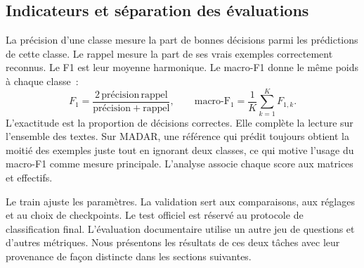 \subsection{Indicateurs et séparation des évaluations}
La précision d’une classe mesure la part de bonnes décisions parmi les prédictions de cette classe. Le rappel mesure la part de ses vrais exemples correctement reconnus. Le F1 est leur moyenne harmonique. Le macro-F1 donne le même poids à chaque classe~:
\[
 F_1 = \frac{2\,\mathrm{précision}\,\mathrm{rappel}}{\mathrm{précision}+\mathrm{rappel}},
 \qquad \mathrm{macro\mbox{-}F_1} = \frac{1}{K}\sum_{k=1}^{K} F_{1,k}.
\]
L’exactitude est la proportion de décisions correctes. Elle complète la lecture sur l’ensemble des textes. Sur MADAR, une référence qui prédit toujours  obtient la moitié des exemples juste tout en ignorant deux classes, ce qui motive l’usage du macro-F1 comme mesure principale. L’analyse associe chaque score aux matrices et effectifs.

Le train ajuste les paramètres. La validation sert aux comparaisons, aux réglages et au choix de checkpoints. Le test officiel est réservé au protocole de classification final. L’évaluation documentaire utilise un autre jeu de questions et d’autres métriques. Nous présentons les résultats de ces deux tâches avec leur provenance de façon distincte dans les sections suivantes.
\FloatBarrier
